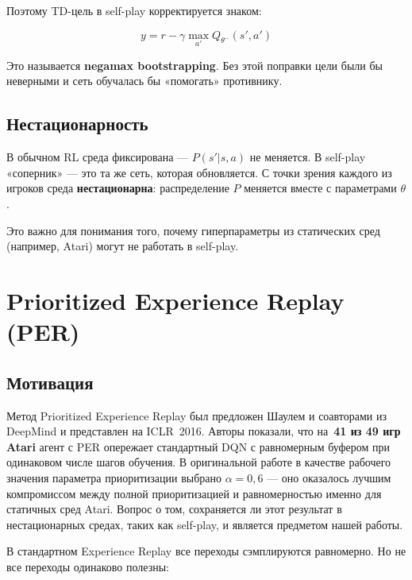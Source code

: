\documentclass[a4paper, 11pt]{article}
\begin{document}
Поэтому TD-цель в self-play корректируется знаком:

\begin{equation}
  \boxed{y = r - \gamma \max_{a'} Q_{\theta^-}(s', a')}
  \label{eq:negamax}
\end{equation}

Это называется \textbf{negamax bootstrapping}. Без этой поправки цели
были бы неверными и сеть обучалась бы «помогать» противнику.

\subsection{Нестационарность}

В обычном RL среда фиксирована — $P(s'|s,a)$ не меняется. В self-play
«соперник» — это та же сеть, которая обновляется. С точки зрения каждого
из игроков среда \textbf{нестационарна}: распределение $P$ меняется
вместе с параметрами $\theta$.

Это важно для понимания того, почему гиперпараметры из статических сред
(например, Atari) могут не работать в self-play.

\section{Prioritized Experience Replay (PER)}

\subsection{Мотивация}

Метод Prioritized Experience Replay был предложен Шаулем и соавторами из
DeepMind \cite{Schaul16} и представлен на ICLR~2016. Авторы показали, что
на~\textbf{41 из 49 игр Atari} агент с PER опережает стандартный DQN с
равномерным буфером при одинаковом числе шагов обучения. В оригинальной
работе в качестве рабочего значения параметра приоритизации выбрано
$\alpha = 0{,}6$ — оно оказалось лучшим компромиссом между
полной приоритизацией и равномерностью именно для статичных сред Atari.
Вопрос о том, сохраняется ли этот результат в нестационарных средах,
таких как self-play, и является предметом нашей работы.

В стандартном Experience Replay все переходы сэмплируются равномерно.
Но не все переходы одинаково полезны:
\end{document}
